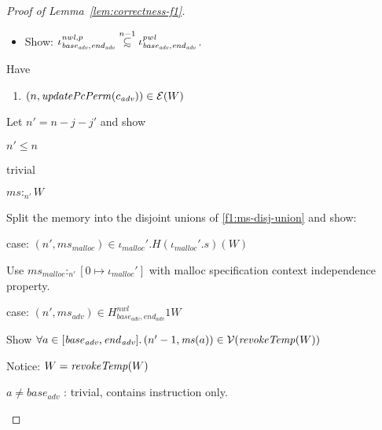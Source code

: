 \documentclass[a4paper]{article}
\newcommand\subsetsim{\mathrel{\ooalign{\raise.2ex\hbox{$\subset$}\cr
      \hidewidth\lower.8ex\hbox{\scalebox{0.9}{$\sim$}}\hidewidth\cr}}}
\newcommand{\nsubsim}[1][n]{\stackrel{\tiny{#1}}{\subsetsim}}
\newcommand{\var}[1]{\mathit{#1}}
\newcommand{\hs}{\var{ms}}
\newcommand{\ms}{\hs}
\newcommand{\start}{\var{base}}
\newcommand{\addrend}{\var{end}}
\newcommand{\heap}{\var{mem}}
\newcommand{\adv}{\var{adv}}
\newcommand{\nwl}{\var{nwl}}
\newcommand{\pwl}{\var{pwl}}
\newcommand{\plainfun}[2]{
  \ifthenelse{\equal{#2}{}}
  {\mathit{#1}}
  {\mathit{#1}(#2)}
}
\newcommand{\updatePcPerm}[1]{\plainfun{updatePcPerm}{#1}}
\newcommand{\revokeTemp}[1]{\plainfun{revokeTemp}{#1}}
\newcommand{\heapSat}[3][\heap]{#1 :_{#2} #3}
\newcommand{\codelabel}[1]{\mathit{#1}}
\newcommand{\malloc}{\codelabel{malloc}}
\newcommand{\asmType}{\plaindom{AsmType}}
\newcommand{\plaindom}[1]{\mathrm{#1}}
\newcommand{\intr}[2]{\mathcal{#1}}
\newcommand{\valueintr}[1]{\intr{V}{#1}}
\newcommand{\exprintr}[1]{\intr{E}{#1}}
\newcommand{\stdvr}{\valueintr{\asmType}}
\newcommand{\stder}{\exprintr{\asmType}}
\newcommand{\npair}[2][n]{\left(#1,#2 \right)}
\begin{document}
\begin{proof}[Proof of Lemma~\ref{lem:correctness-f1}]
\begin{itemize}
\begin{itemize}
                  \item Show: $\iota^{\nwl,p}_{\start_\adv,\addrend_\adv} \nsubsim[n-1] \iota^\pwl_{\start_\adv,\addrend_\adv}$.
                  \end{itemize}
                \end{itemize}
                Have
                \begin{enumerate}[resume]
                \item $\npair{\updatePcPerm{c_{\var{adv}}}} \in \stder(W)$
                \end{enumerate}
                Let $n' = n - j - j'$ and show
                \begin{enumproof}[resume]
                \item $n' \leq n$
                  \begin{enumproof}
                  \item trivial
                  \end{enumproof}
                \item $\heapSat[\ms]{n'}{W}$
                  \begin{enumproof}
                  \item Split the memory into the disjoint unions of \ref{f1:ms-disj-union} and show:
                    \begin{enumproof}
                    \item case: $\npair[n']{\ms_\malloc} \in \iota_\malloc'.H (\iota_\malloc'.s) (W)$ 
                      \begin{enumproof}
                      \item Use $\heapSat[\ms_\malloc]{n'}{[0 \mapsto \iota_\malloc']}$ with malloc specification context independence property.
                      \end{enumproof}
                    \item case: $\npair[n']{\ms_\adv} \in H^\nwl_{\start_\adv,\addrend_\adv} 1 W$ \label{lem:f1-adv-mem-sat}
                      \begin{enumproof}
                      \item Show $\forall a \in [\start_\adv,\addrend_\adv] \ldotp \npair[n'-1]{\ms(a)} \in \stdvr(\revokeTemp{W})$
                      \item Notice: $W = \revokeTemp{W}$
                      \end{enumproof}
                      \begin{enumproof}
                      \item $a \neq \start_\adv$ : trivial, contains instruction only.

\end{enumproof}
\end{enumproof}
\end{enumproof}
\end{enumproof}
\end{proof}
\end{document}
